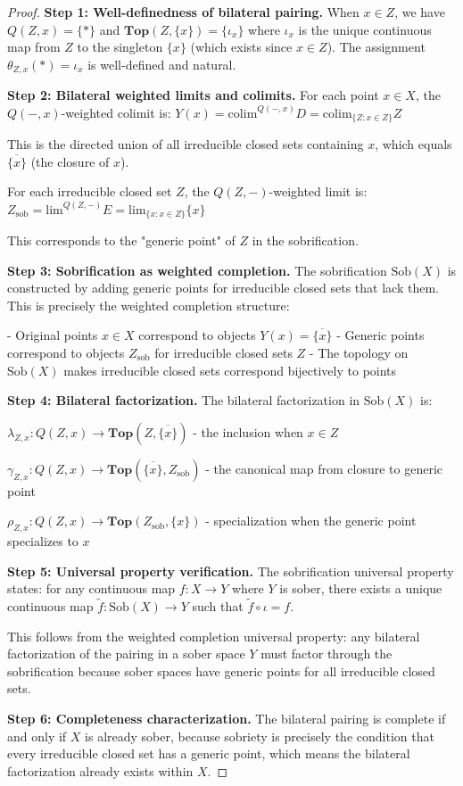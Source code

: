 \documentclass[11pt]{article}
\theoremstyle{plain}
\theoremstyle{definition}
\theoremstyle{remark}
\newcommand{\colim}{\mathrm{colim}}
\renewcommand{\lim}{\mathrm{lim}}
\begin{document}
\begin{proof}
\textbf{Step 1: Well-definedness of bilateral pairing.}
When $x \in Z$, we have $Q(Z, x) = \{*\}$ and $\mathbf{Top}(Z, \{x\}) = \{\iota_x\}$ where $\iota_x$ is the unique continuous map from $Z$ to the singleton $\{x\}$ (which exists since $x \in Z$). The assignment $\theta_{Z,x}(*) = \iota_x$ is well-defined and natural.

\textbf{Step 2: Bilateral weighted limits and colimits.}
For each point $x \in X$, the $Q(-, x)$-weighted colimit is:
$Y(x) = \colim^{Q(-, x)} D = \colim_{\{Z : x \in Z\}} Z$

This is the directed union of all irreducible closed sets containing $x$, which equals $\overline{\{x\}}$ (the closure of $x$).

For each irreducible closed set $Z$, the $Q(Z, -)$-weighted limit is:
$Z_{\text{sob}} = \lim^{Q(Z, -)} E = \lim_{\{x : x \in Z\}} \{x\}$

This corresponds to the "generic point" of $Z$ in the sobrification.

\textbf{Step 3: Sobrification as weighted completion.}
The sobrification $\text{Sob}(X)$ is constructed by adding generic points for irreducible closed sets that lack them. This is precisely the weighted completion structure:

- Original points $x \in X$ correspond to objects $Y(x) = \overline{\{x\}}$
- Generic points correspond to objects $Z_{\text{sob}}$ for irreducible closed sets $Z$
- The topology on $\text{Sob}(X)$ makes irreducible closed sets correspond bijectively to points

\textbf{Step 4: Bilateral factorization.}
The bilateral factorization in $\text{Sob}(X)$ is:

$\lambda_{Z,x} : Q(Z, x) \to \mathbf{Top}(Z, \overline{\{x\}})$ - the inclusion when $x \in Z$

$\gamma_{Z,x} : Q(Z, x) \to \mathbf{Top}(\overline{\{x\}}, Z_{\text{sob}})$ - the canonical map from closure to generic point

$\rho_{Z,x} : Q(Z, x) \to \mathbf{Top}(Z_{\text{sob}}, \{x\})$ - specialization when the generic point specializes to $x$

\textbf{Step 5: Universal property verification.}
The sobrification universal property states: for any continuous map $f : X \to Y$ where $Y$ is sober, there exists a unique continuous map $\tilde{f} : \text{Sob}(X) \to Y$ such that $\tilde{f} \circ \iota = f$.

This follows from the weighted completion universal property: any bilateral factorization of the pairing in a sober space $Y$ must factor through the sobrification because sober spaces have generic points for all irreducible closed sets.

\textbf{Step 6: Completeness characterization.}
The bilateral pairing is complete if and only if $X$ is already sober, because sobriety is precisely the condition that every irreducible closed set has a generic point, which means the bilateral factorization already exists within $X$.
\end{proof}
\end{document}
